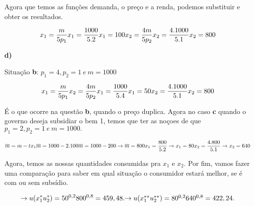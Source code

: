 \documentclass[a4paper, 12pt]{article} %
\begin{document}
\begin{flushleft}
	\begin{center}
		Agora que temos as funções demanda, o preço e a renda, podemos substituir e obter os resultados.
	\end{center}

	\begin{equation}
		x_{1} = \dfrac{m}{5p_{1}}
		$$\\$$
		x_{1} = \dfrac{1000}{5.2}
		$$\\$$
		x_{1} = 100
		$$\\$$
		x_{2} = \dfrac{4m}{5p_{2}}
		$$\\$$
		x_{2} = \dfrac{4.1000}{5.1}
		$$\\$$
		x_{2} = 800
	\end{equation}
	
	\textbf{d)}
	\\
\begin{center}
	Situação \textbf{b}: $p_{1} = 4, p_{2} = 1 \ e \ m = 1000$
\end{center}

\begin{equation}
	x_{1} = \dfrac{m}{5p_{1}}
	$$\\$$
	x_{2} = \dfrac{4m}{5p_{2}} 
	$$\\$$
	x_{1} = \dfrac{1000}{5.4}
	$$\\$$
	x_{1} = 50
	$$\\$$
	x_{2} = \dfrac{4.1000}{5.1}
	$$\\$$
	x_{2} = 800
\end{equation}

\begin{center}
	É o que ocorre na questão \textbf{b}, quando o preço duplica. Agora no caso \textbf{c} quando o governo deseja subsidiar o bem 1, temos que ter as noçoes de que $p_{1} = 2, p_{2} = 1 \ e \ m = 1000.$
\end{center}

\begin{equation}
	\overline{m} = m - tx_{1}
	$$\\$$
	\overline{m} = 1000 - 2.100
	$$\\$$
	\overline{m} = 1000 - 200 \rightarrow \overline{m} = 800
	$$\\$$
	x_{1} = \dfrac{800}{5.2} \rightarrow x_{1} = 80
	$$\\$$
	x_{2} = \dfrac{4.800}{5.1} \rightarrow x_{2} = 640
\end{equation}
 \begin{center}
	 Agora, temos as nossas quantidades consumidas pra $x_{1}$ e $x_{2}$. Por fim, vamos fazer uma comparação para saber em qual situação o consumidor estará melhor, se é com ou sem subsídio.
 \end{center}
 \begin{equation}
	\rightarrow u(x_{1}^{*}u_{2}^{*}) = 50^{0,2}800^{0,8} = 459,48.
	$$\\$$
	\rightarrow u(x_{1}^{**}u_{2}^{**}) = 80^{0,2}640^{0,8} = 422,24.
 \end{equation}


\end{flushleft}
\end{document}
